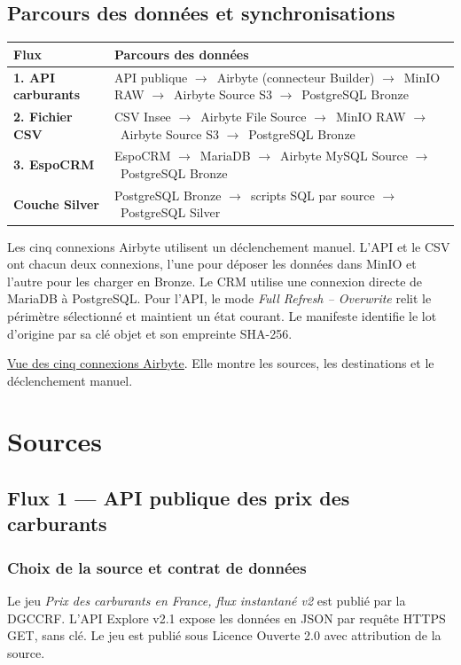 \documentclass[11pt,a4paper]{article}
\newcommand{\flux}{\ensuremath{\rightarrow}}
\newcommand{\preuve}[2]{%
  \href{https://github.com/MAHDIghr/projet_big_data_starter/blob/27cc8348f6737a75bb24a40d6d8cda3ae54996b3/preuves/#1}{\textcolor{encre}{\underline{#2}}}}
\begin{document}
\subsection{Parcours des données et synchronisations}

{\small
\begin{tabularx}{\linewidth}{@{}>{\bfseries}p{3cm}X@{}}
\toprule
Flux & Parcours des données \\
\midrule
1. API carburants &
API publique \flux\ Airbyte (connecteur Builder) \flux\ MinIO RAW
\flux\ Airbyte Source S3 \flux\ PostgreSQL Bronze \\
2. Fichier CSV &
CSV Insee \flux\ Airbyte File Source \flux\ MinIO RAW
\flux\ Airbyte Source S3 \flux\ PostgreSQL Bronze \\
3. EspoCRM &
EspoCRM \flux\ MariaDB \flux\ Airbyte MySQL Source
\flux\ PostgreSQL Bronze \\
\midrule
Couche Silver &
PostgreSQL Bronze \flux\ scripts SQL par source
\flux\ PostgreSQL Silver \\
\bottomrule
\end{tabularx}
}

Les cinq connexions Airbyte utilisent un déclenchement manuel. L'API
et le CSV ont chacun deux connexions, l'une pour déposer les données
dans MinIO et l'autre pour les charger en Bronze. Le CRM utilise une
connexion directe de MariaDB à PostgreSQL. Pour l'API, le mode
\emph{Full Refresh -- Overwrite} relit le périmètre sélectionné
et maintient un état courant. Le manifeste identifie le lot d'origine
par sa clé objet et son empreinte SHA-256.

\preuve{airbyte/connexions_vue_ensemble.png}{Vue des cinq connexions Airbyte}.
Elle montre les sources, les destinations et le déclenchement manuel.

\section{Sources}

\subsection{Flux 1 --- API publique des prix des carburants}

\subsubsection{Choix de la source et contrat de données}

Le jeu \emph{Prix des carburants en France, flux instantané v2} est
publié par la DGCCRF. L'API Explore v2.1 expose les données en JSON
par requête HTTPS GET, sans clé. Le jeu est publié sous Licence
Ouverte 2.0 avec attribution de la source.
\end{document}
